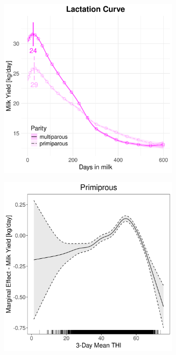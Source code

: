 \begin{figure}[H]
\begin{subfigure}[b]{0.45\textwidth}
        \includegraphics[width=\textwidth]{thesis/figures/models/milk/before2010/sf_milk_before2010/sf_milk_before2010_marginal_dim_milk_combined.png}
    \end{subfigure}
    \begin{subfigure}[b]{0.45\textwidth}
        \centering
        \includegraphics[width=\textwidth]{thesis/figures/models/milk/before2010/sf_milk_before2010/sf_milk_before2010_marginal_thi_milk_primi.png}

\end{subfigure}
\end{figure}
